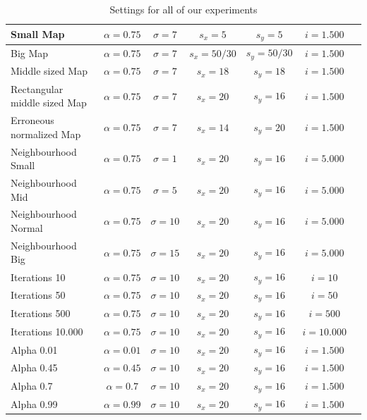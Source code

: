 \documentclass{acm_proc_article-sp}
\begin{document}
\begin{table}
\centering
\begin{tabular}{|l|c|c|c|c|c|c|}
    \hline
    Small Map & $\alpha = 0.75$ & $\sigma = 7$ & $s_x=5$ & $s_y=5$ & $i=1.500$ \\
    \hline
    Big Map & $\alpha = 0.75$ & $\sigma = 7$ & $s_x=50/30$ & $s_y=50/30$ & $i=1.500$ \\
    \hline
    Middle sized Map & $\alpha = 0.75$ & $\sigma = 7$ & $s_x=18$ & $s_y=18$ & $i=1.500$ \\
    \hline
    Rectangular middle sized Map & $\alpha = 0.75$ & $\sigma = 7$ & $s_x=20$ & $s_y=16$ & $i=1.500$ \\
    \hline
    Erroneous normalized Map & $\alpha = 0.75$ & $\sigma = 7$ & $s_x=14$ & $s_y=20$ & $i=1.500$ \\
    \hline
    Neighbourhood Small & $\alpha = 0.75$ & $\sigma = 1$ & $s_x=20$ & $s_y=16$ & $i=5.000$ \\
    \hline
    Neighbourhood Mid & $\alpha = 0.75$ & $\sigma = 5$ & $s_x=20$ & $s_y=16$ & $i=5.000$ \\
    \hline
    Neighbourhood Normal & $\alpha = 0.75$ & $\sigma = 10$ & $s_x=20$ & $s_y=16$ & $i=5.000$ \\
    \hline
    Neighbourhood Big & $\alpha = 0.75$ & $\sigma = 15$ & $s_x=20$ & $s_y=16$ & $i=5.000$ \\
    \hline
    Iterations 10 & $\alpha = 0.75$ & $\sigma = 10$ & $s_x=20$ & $s_y=16$ & $i=10$ \\
    \hline
    Iterations 50 & $\alpha = 0.75$ & $\sigma = 10$ & $s_x=20$ & $s_y=16$ & $i=50$ \\
    \hline
    Iterations 500 & $\alpha = 0.75$ & $\sigma = 10$ & $s_x=20$ & $s_y=16$ & $i=500$ \\
    \hline
    Iterations 10.000 & $\alpha = 0.75$ & $\sigma = 10$ & $s_x=20$ & $s_y=16$ & $i=10.000$ \\
    \hline
    Alpha 0.01 & $\alpha = 0.01$ & $\sigma = 10$ & $s_x=20$ & $s_y=16$ & $i=1.500$ \\
    \hline
    Alpha 0.45 & $\alpha = 0.45$ & $\sigma = 10$ & $s_x=20$ & $s_y=16$ & $i=1.500$ \\
    \hline
    Alpha 0.7 & $\alpha = 0.7$ & $\sigma = 10$ & $s_x=20$ & $s_y=16$ & $i=1.500$ \\
    \hline
    Alpha 0.99 & $\alpha = 0.99$ & $\sigma = 10$ & $s_x=20$ & $s_y=16$ & $i=1.500$ \\
    \hline
\end{tabular}
\caption{Settings for all of our experiments}
\label{tab:settings}
\end{table}
\end{document}
